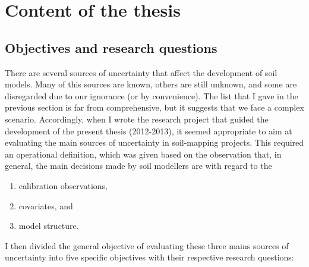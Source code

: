 \section{Content of the thesis}
\label{sec:thesis-content}

\subsection{Objectives and research questions}
\label{sec:thesis-objectives}

There are several sources of uncertainty that affect the development of soil models. Many
of this sources are known, others are still unknown, and some are disregarded due to our ignorance
(or by convenience). The list that I gave in the previous section is far from comprehensive, but it
suggests that we face a complex scenario. Accordingly, when I wrote the research project that
guided the development of the present thesis (2012-2013), it seemed appropriate to aim at evaluating
the main sources of uncertainty in soil-mapping projects. This required an operational definition,
which was given based on the observation that, in general, the main decisions made by soil
modellers are with regard to the

\begin{enumerate}[label=(\alph*)]
\item calibration observations,
\item covariates, and
\item model structure.
\end{enumerate}

I then divided the general objective of evaluating these three mains sources of uncertainty into five
specific objectives with their respective research questions:

